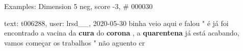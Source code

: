 \begin{frame}{Examples: Dimension 5 neg, score -3, \# 000030}
\footnotesize
\begin{alertblock}{text: t006288, user: lrsd\_\_, 2020-05-30}
binha veio aqui e falou " é já foi encontrado a vacina da \textbf{cura} do 
\textbf{corona} , a \textbf{quarentena} já está acabando, vamos começar os 
trabalhos " não aguento cr 
\end{alertblock}
\end{frame}
